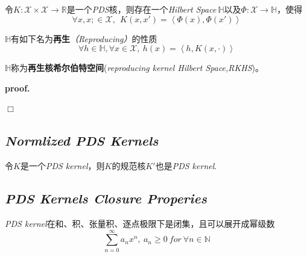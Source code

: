\begin{mdframed}
    \begin{theorem}
        令$K:\mathcal{X}\times \mathcal{X}\rightarrow \mathbb{R}$是一个\textsl{PDS}核，则存在一个\textsl{Hilbert Space}$\ \mathbb{H}$以及$\Phi:\mathcal{X}\rightarrow \mathbb{H}$，使得
        \begin{equation}
            \forall x,x;\in \mathcal{X},\ \ K(x,x')=\left<\Phi(x),\Phi(x')\right>
        \end{equation}

        $\mathbb{H}$有如下名为\textbf{再生}\textsl{（Reproducing）}的性质
        \begin{equation}
            \forall h\in \mathbb{H},\forall x\in \mathcal{X},\ h(x)=\left< h,K(x,\cdot) \right>
        \end{equation}

        $\mathbb{H}$称为\textbf{再生核希尔伯特空间}(\textsl{reproducing kernel Hilbert Space,RKHS})。
    \end{theorem}
\end{mdframed}

\textbf{proof.}\hspace{1em}

$\Box$

\subsection*{\textsl{Normlized PDS Kernels}}

\begin{mdframed}
    \begin{lemma}
        令$K$是一个\textsl{PDS kernel}，则$K$的规范核$K'$也是\textsl{PDS kernel}.
    \end{lemma}
\end{mdframed}

\subsection*{\textsl{PDS Kernels Closure Properies}}

\begin{mdframed}
    \begin{theorem}
        \textsl{PDS kernel}在和、积、张量积、逐点极限下是闭集，且可以展开成幂级数
        \begin{equation}
            \sum^{\infty}_{n=0}a_nx^n,\ a_n\geqslant 0\ for\ \forall n\in \mathbb{N}
        \end{equation}
    \end{theorem}
\end{mdframed}

